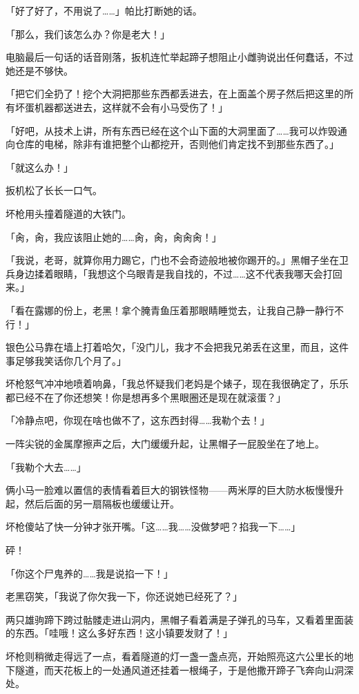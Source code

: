 「好了好了，不用说了……」帕比打断她的话。

「那么，我们该怎么办？你是老大！」

电脑最后一句话的话音刚落，扳机连忙举起蹄子想阻止小雌驹说出任何蠢话，不过她还是不够快。

「把它们全扔了！挖个大洞把那些东西都丢进去，在上面盖个房子然后把这里的所有坏蛋机器都送进去，这样就不会有小马受伤了！」

「好吧，从技术上讲，所有东西已经在这个山下面的大洞里面了……我可以炸毁通向仓库的电梯，除非有谁把整个山都挖开，否则他们肯定找不到那些东西了。」

「就这么办！」

扳机松了长长一口气。

\horizonline


坏枪用头撞着隧道的大铁门。

「肏，肏，我应该阻止她的……肏，肏，肏肏肏！」

「我说，老哥，就算你用力踢它，门也不会奇迹般地被你踢开的。」黑帽子坐在卫兵身边揉着眼睛，「我想这个乌眼青是我自找的，不过……这不代表我哪天会打回来。」

「看在露娜的份上，老黑！拿个腌青鱼压着那眼睛睡觉去，让我自己静一静行不行！」

银色公马靠在墙上打着哈欠，「没门儿，我才不会把我兄弟丢在这里，而且，这件事足够我笑话你几个月了。」

坏枪怒气冲冲地喷着响鼻，「我总怀疑我们老妈是个婊子，现在我很确定了，乐乐都已经不在了你还想笑！你是想再多个黑眼圈还是现在就滚蛋？」

「冷静点吧，你现在啥也做不了，这东西封得……我勒个去！」

一阵尖锐的金属摩擦声之后，大门缓缓升起，让黑帽子一屁股坐在了地上。

「我勒个大去……」

俩小马一脸难以置信的表情看着巨大的钢铁怪物——两米厚的巨大防水板慢慢升起，然后后面的另一扇隔板也缓缓让开。

坏枪傻站了快一分钟才张开嘴。「这……我……没做梦吧？掐我一下……」

砰！

「你这个尸鬼养的……我是说掐一下！」

老黑窃笑，「我说了你欠我一下，你还说她已经死了？」

两只雄驹蹄下跨过骷髅走进山洞内，黑帽子看着满是子弹孔的马车，又看着里面装的东西。「哇哦！这么多好东西！这小镇要发财了！」

坏枪则稍微走得远了一点，看着隧道的灯一盏一盏点亮，开始照亮这六公里长的地下隧道，而天花板上的一处通风道还挂着一根绳子，于是他撒开蹄子飞奔向山洞深处。

